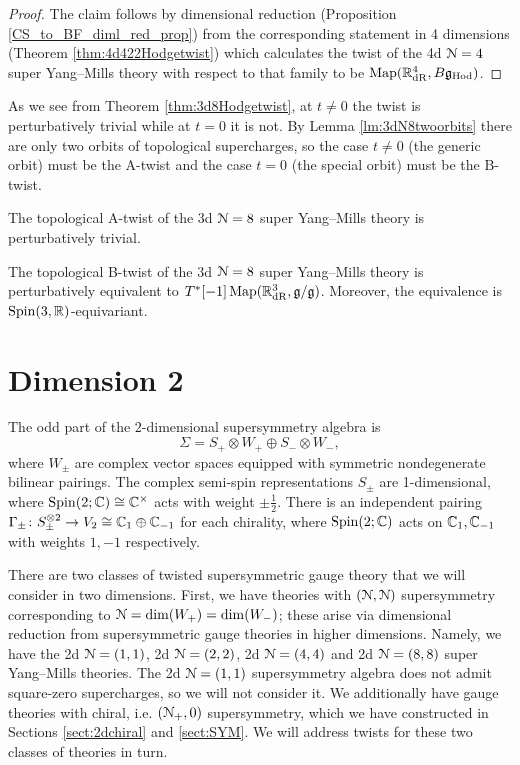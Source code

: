 \documentclass[10pt, oneside]{article}
\begin{document}
\begin{proof}
The claim follows by dimensional reduction (Proposition \ref{CS_to_BF_diml_red_prop}) from the corresponding statement in 4 dimensions (Theorem \ref{thm:4d422Hodgetwist}) which calculates the twist of the 4d $\mathcal N=4$ super Yang--Mills theory with respect to that family to be $\operatorname{Map}(\mathbb R^4_{\mathrm{dR}}, B\mathfrak g_{\mathrm{Hod}})$.
\end{proof}

As we see from Theorem \ref{thm:3d8Hodgetwist}, at $t\neq 0$ the twist is perturbatively trivial while at $t=0$ it is not. By Lemma \ref{lm:3dN8twoorbits} there are only two orbits of topological supercharges, so the case $t\neq 0$ (the generic orbit) must be the A-twist and the case $t=0$ (the special orbit) must be the B-twist.

\begin{corollary}
The topological A-twist of the 3d $\mathcal N=8$ super Yang--Mills theory is perturbatively trivial.
\label{cor:3dN8Atwist}
\end{corollary}

\begin{corollary}
The topological B-twist of the 3d $\mathcal N=8$ super Yang--Mills theory is perturbatively equivalent to $T^*[-1]\operatorname{Map}(\mathbb R^3_{\mathrm{dR}}, \mathfrak g/\mathfrak g)$. Moreover, the equivalence is $\mathrm{Spin}(3, \mathbb R)$-equivariant.
\label{cor:3dN8Btwist}
\end{corollary}

\section{Dimension 2}
The odd part of the $2$-dimensional supersymmetry algebra is 
\[
\Sigma = S_+ \otimes W_+ \oplus S_- \otimes W_- ,
\]
where $W_\pm$ are complex vector spaces equipped with symmetric nondegenerate bilinear pairings. 
The complex semi-spin representations $S_\pm$ are 1-dimensional, where $\mathrm{Spin}(2;\mathbb C) \cong \mathbb C^\times$ acts with weight $\pm \frac{1}{2}$. 
There is an independent pairing $\Gamma_\pm \colon S_\pm^{\otimes 2} \to V_2 \cong \mathbb C_1 \oplus \mathbb C_{-1}$ for each chirality, where $\mathrm{Spin}(2;\mathbb C)$ acts on $\mathbb C_1, \mathbb C_{-1}$ with weights $1, -1$ respectively.

There are two classes of twisted supersymmetric gauge theory that we will consider in two dimensions.  First, we have theories with $(\mathcal{N}, \mathcal{N})$ supersymmetry corresponding to $\mathcal N = \dim(W_+) = \dim(W_-)$; these arise via dimensional reduction from supersymmetric gauge theories in higher dimensions. Namely, we have the 2d $\mathcal N=(1, 1)$, 2d $\mathcal N=(2, 2)$, 2d $\mathcal N=(4, 4)$ and 2d $\mathcal N=(8, 8)$ super Yang--Mills theories. 
The 2d $\mathcal N=(1, 1)$ supersymmetry algebra does not admit square-zero supercharges, so we will not consider it. We additionally have gauge theories with chiral, i.e. $(\mathcal N_+, 0)$ supersymmetry, which we have constructed in Sections \ref{sect:2dchiral} and \ref{sect:SYM}. 
We will address twists for these two classes of theories in turn.
\end{document}
